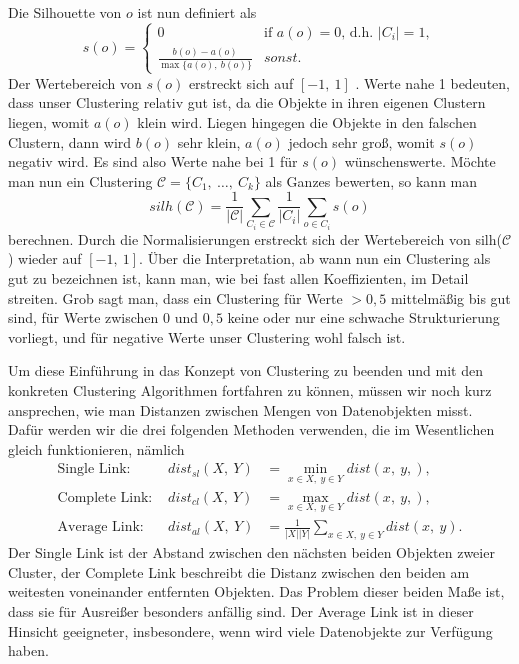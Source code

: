 Die Silhouette von \(o\) ist nun
definiert als
\[ s(o) = \begin{cases}
		0 & \text{if } a(o)=0\text{, d.h. } \left| C_i \right| = 1,\\
		\frac{b(o)-a(o)}{\max\{a(o),\ b(o)\}} & sonst.
		\end{cases}\]
Der Wertebereich von \(s(o)\) erstreckt sich auf \([-1,\ 1]\) .
Werte nahe 1 bedeuten, dass unser Clustering relativ gut ist,
da die Objekte in ihren eigenen Clustern liegen, womit \(a(o)\)
klein wird. Liegen hingegen die Objekte in den falschen Clustern, 
dann wird \(b(o)\) sehr klein, \(a(o)\) jedoch sehr groß, womit
\(s(o)\) negativ wird. Es sind also Werte nahe bei 1 für \(s(o)\)
wünschenswerte. Möchte man nun ein Clustering \(\mathcal{C}=
\{C_1,\ \dots ,\ C_k\}\) als Ganzes bewerten, so kann man
\[ silh(\mathcal{C}) = \frac{1}{\left| \mathcal{C}\right|}
\sum_{C_i \in \mathcal{C}}\frac{1}{\left| C_i\right|}
\sum_{o\in C_i} s(o)\]
berechnen. Durch die Normalisierungen erstreckt sich der
Wertebereich von silh(\(\mathcal{C}\)) wieder auf  \([-1,\ 1]\).
Über die Interpretation, ab wann nun ein Clustering als gut
zu bezeichnen ist, kann man, wie bei fast allen Koeffizienten,
im Detail streiten. Grob sagt man, dass ein Clustering für 
Werte \(> 0,5\) mittelmäßig bis gut sind, für Werte zwischen
\(0\) und \(0,5\) keine oder nur eine schwache Strukturierung 
vorliegt, und für negative Werte unser Clustering wohl falsch ist.

Um diese Einführung in das Konzept von Clustering zu beenden 
und mit den konkreten Clustering Algorithmen fortfahren zu können,
müssen wir noch kurz ansprechen, wie man Distanzen zwischen
Mengen von Datenobjekten misst. Dafür werden wir die drei folgenden
Methoden verwenden, die im Wesentlichen gleich funktionieren,
nämlich
\begin{align*}
\text{Single Link: }& dist_{sl}(X,\ Y) &= \min_{x\in X,\ y\in Y} 
dist(x,\ y,),\\
\text{Complete Link: }& dist_{cl}(X,\ Y) &= \max_{x\in X,\ y\in Y} 
dist(x,\ y,),\\
\text{Average Link: }& dist_{al}(X,\ Y) &= 
\frac{1}{\left|X\right|\left|Y\right|}\sum_{x\in X,\ y\in Y} 
dist(x,\ y).
\end{align*}
Der Single Link ist der Abstand zwischen den nächsten beiden Objekten
zweier Cluster, der Complete Link beschreibt die Distanz zwischen den
beiden am weitesten voneinander entfernten Objekten. Das Problem
dieser beiden Maße ist, dass sie für Ausreißer besonders anfällig sind.
Der Average Link ist in dieser Hinsicht geeigneter, insbesondere, wenn
wird viele Datenobjekte zur Verfügung haben.


